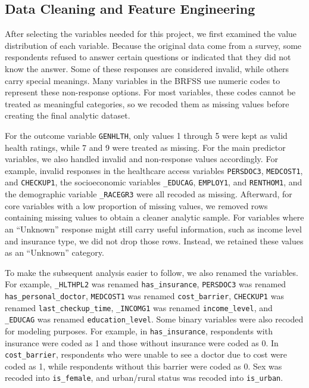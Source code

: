 \subsection{Data Cleaning and Feature Engineering}
After selecting the variables needed for this project, we first examined the value distribution of each variable. Because the original data come from a survey, some respondents refused to answer certain questions or indicated that they did not know the answer. Some of these responses are considered invalid, while others carry special meanings. Many variables in the BRFSS use numeric codes to represent these non-response options. For most variables, these codes cannot be treated as meaningful categories, so we recoded them as missing values before creating the final analytic dataset.

For the outcome variable \texttt{GENHLTH}, only values 1 through 5 were kept as valid health ratings, while 7 and 9 were treated as missing. For the main predictor variables, we also handled invalid and non-response values accordingly. For example, invalid responses in the healthcare access variables \texttt{PERSDOC3}, \texttt{MEDCOST1}, and \texttt{CHECKUP1}, the socioeconomic variables \texttt{\_EDUCAG}, \texttt{EMPLOY1}, and \texttt{RENTHOM1}, and the demographic variable \texttt{\_RACEGR3} were all recoded as missing. Afterward, for core variables with a low proportion of missing values, we removed rows containing missing values to obtain a cleaner analytic sample. For variables where an ``Unknown'' response might still carry useful information, such as income level and insurance type, we did not drop those rows. Instead, we retained these values as an ``Unknown'' category.

To make the subsequent analysis easier to follow, we also renamed the variables. For example, \texttt{\_HLTHPL2} was renamed \texttt{has\_insurance}, \texttt{PERSDOC3} was renamed \texttt{has\_personal\_doctor}, \texttt{MEDCOST1} was renamed \texttt{cost\_barrier}, \texttt{CHECKUP1} was renamed \texttt{last\_checkup\_time}, \texttt{\_INCOMG1} was renamed \texttt{income\_level}, and \texttt{\_EDUCAG} was renamed \texttt{education\_level}. Some binary variables were also recoded for modeling purposes. For example, in \texttt{has\_insurance}, respondents with insurance were coded as 1 and those without insurance were coded as 0. In \texttt{cost\_barrier}, respondents who were unable to see a doctor due to cost were coded as 1, while respondents without this barrier were coded as 0. Sex was recoded into \texttt{is\_female}, and urban/rural status was recoded into \texttt{is\_urban}.

